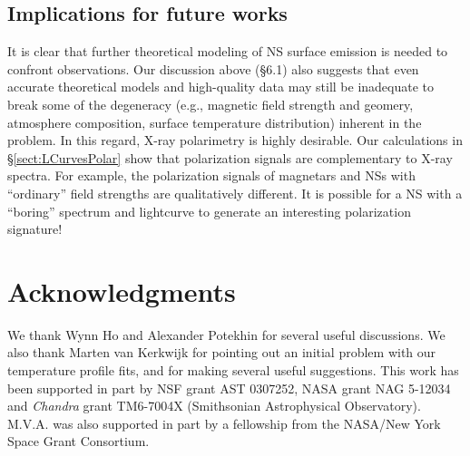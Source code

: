 \documentclass[useAMS,onecolumn,usenatbib,usegraphicx]{mn2e}
\begin{document}

\subsection{Implications for future works}

It is clear that further theoretical modeling of NS surface
emission is needed to confront observations. Our discussion 
above (\S 6.1) also suggests that even accurate theoretical
models and high-quality data may still be inadequate to break some of the
degeneracy (e.g., magnetic field strength and geomery, atmosphere
composition, surface temperature distribution)
inherent in the problem. In this regard, X-ray polarimetry is
highly desirable. Our calculations in \S\ref{sect:LCurvesPolar} show that polarization 
signals are complementary to X-ray spectra. For example,
the polarization signals of magnetars and NSs with ``ordinary'' field
strengths are qualitatively different. It is possible for 
a NS with a ``boring'' spectrum and lightcurve to generate
an interesting polarization signature!


\section*{Acknowledgments}
We thank Wynn Ho and Alexander Potekhin for several useful discussions.
%
%
We also thank Marten van Kerkwijk for pointing out an initial 
problem with our temperature profile fits, and for making 
several useful suggestions.
This work has been supported in part by NSF grant AST 0307252,
NASA grant NAG 5-12034 and {\it Chandra} grant TM6-7004X
(Smithsonian Astrophysical Observatory).  
M.V.A. was also supported in part by a fellowship from the NASA/New York 
Space Grant Consortium.

\end{document}
